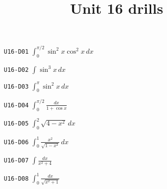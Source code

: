 
\title{Unit 16 drills}

\maketitle
\begin{enumerate}
  \item[\texttt{U16-D01}] $\displaystyle\int_{0}^{\pi/2}\sin^{2}x\cos^{2}x\,dx$
  \item[\texttt{U16-D02}] $\displaystyle\int\sin^{3}x\,dx$
  \item[\texttt{U16-D03}] $\displaystyle\int_{0}^{\pi}\sin^{2}x\,dx$
  \item[\texttt{U16-D04}] $\displaystyle\int_{0}^{\pi/2}\frac{dx}{1+\cos x}$
  \item[\texttt{U16-D05}] $\displaystyle\int_{0}^{2}\sqrt{4-x^{2}}\,dx$
  \item[\texttt{U16-D06}] $\displaystyle\int_{0}^{1}\frac{x^{2}}{\sqrt{1-x^{2}}}\,dx$
  \item[\texttt{U16-D07}] $\displaystyle\int\frac{dx}{x^{2}+4}$
  \item[\texttt{U16-D08}] $\displaystyle\int_{0}^{1}\frac{dx}{\sqrt{x^{2}+1}}$
\end{enumerate}

